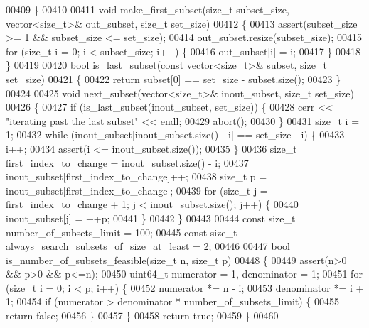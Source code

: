 \begin{DoxyCode}
{{00409 \}
00410 
00411 \textcolor{keywordtype}{void} make\_first\_subset(\textcolor{keywordtype}{size\_t} subset\_size, vector<size\_t>& out\_subset, \textcolor{keywordtype}{size\_t} set\_size)
00412 \{
00413   assert(subset\_size >= 1 && subset\_size <= set\_size);
00414   out\_subset.resize(subset\_size);
00415   \textcolor{keywordflow}{for} (\textcolor{keywordtype}{size\_t} i = 0; i < subset\_size; i++) \{
00416     out\_subset[i] = i;
00417   \}
00418 \}
00419 
00420 \textcolor{keywordtype}{bool} is\_last\_subset(\textcolor{keyword}{const} vector<size\_t>& subset, \textcolor{keywordtype}{size\_t} set\_size)
00421 \{
00422   \textcolor{keywordflow}{return} subset[0] == set\_size - subset.size();
00423 \}
00424 
00425 \textcolor{keywordtype}{void} next\_subset(vector<size\_t>& inout\_subset, \textcolor{keywordtype}{size\_t} set\_size)
00426 \{
00427   \textcolor{keywordflow}{if} (is\_last\_subset(inout\_subset, set\_size)) \{
00428     cerr << \textcolor{stringliteral}{"iterating past the last subset"} << endl;
00429     abort();
00430   \}
00431   \textcolor{keywordtype}{size\_t} i = 1;
00432   \textcolor{keywordflow}{while} (inout\_subset[inout\_subset.size() - i] == set\_size - i) \{
00433     i++;
00434     assert(i <= inout\_subset.size());
00435   \}
00436   \textcolor{keywordtype}{size\_t} first\_index\_to\_change = inout\_subset.size() - i;
00437   inout\_subset[first\_index\_to\_change]++;
00438   \textcolor{keywordtype}{size\_t} p = inout\_subset[first\_index\_to\_change];
00439   \textcolor{keywordflow}{for} (\textcolor{keywordtype}{size\_t} j = first\_index\_to\_change + 1; j < inout\_subset.size(); j++) \{
00440     inout\_subset[j] = ++p;
00441   \}
00442 \}
00443 
00444 \textcolor{keyword}{const} \textcolor{keywordtype}{size\_t} number\_of\_subsets\_limit = 100;
00445 \textcolor{keyword}{const} \textcolor{keywordtype}{size\_t} always\_search\_subsets\_of\_size\_at\_least = 2;
00446 
00447 \textcolor{keywordtype}{bool} is\_number\_of\_subsets\_feasible(\textcolor{keywordtype}{size\_t} n, \textcolor{keywordtype}{size\_t} p)
00448 \{ 
00449   assert(n>0 && p>0 && p<=n);
00450   uint64\_t numerator = 1, denominator = 1;
00451   \textcolor{keywordflow}{for} (\textcolor{keywordtype}{size\_t} i = 0; i < p; i++) \{
00452     numerator *= n - i;
00453     denominator *= i + 1;
00454     \textcolor{keywordflow}{if} (numerator > denominator * number\_of\_subsets\_limit) \{
00455       \textcolor{keywordflow}{return} \textcolor{keyword}{false};
00456     \}
00457   \}
00458   \textcolor{keywordflow}{return} \textcolor{keyword}{true};
00459 \}
00460 
}}
\end{DoxyCode}
